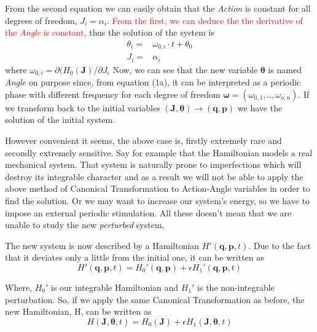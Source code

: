 	From the second equation we can easily obtain that the \textit{Action} is constant for all degrees of freedom, $J_i =\alpha_i$. \textcolor{red}{From the first, we can deduce the the derivative of the \textit{Angle} is constant,} thus the solution of the system is 
	\begin{subequations}\label{eq3}
		\begin{alignat}{2}
			\theta_i =& \omega_{0,i} \cdot t + \theta_0 \\ 
			J_i      =& \alpha_i
		\end{alignat}
	\end{subequations}
 	where $\omega_{0,i} = \partial(H_0(\bm{J})/\partial{J_i}$	
	Now, we can see that the new variable $\bm{\theta}$ is named \textit{Angle} on purpose since, from equation (1a), it can be interpreted as a periodic phase with different frequency for each degree of freedom $\bm{\omega} = (\omega_{0,1},..,\omega_{o,n})$.
	If we transform back to the initial variables $(\bm{J},\bm{\theta})\rightarrow(\bm{q},\bm{p})$ we have the solution of the initial system.
	
	However convenient it seems, the above case is, firstly extremely rare and secondly extremely sensitive. Say for example that the Hamiltonian models a real mechanical system. That system is naturally prone to imperfections which will destroy its integrable character and as a result we will not be able to apply the above method of Canonical Transformation to Action-Angle variables in order to find the solution. Or we may want to increase our system's energy, so we have to impose an external periodic stimulation.
	All these doesn't mean that we are unable to study the new \textit{perturbed} system.
	
	The new system is now described by a Hamiltonian $H'(\bm{q},\bm{p},t)$. Due to the fact that it deviates only a little from the initial one, it can be written as 
		\begin{equation}\label{eq4}
			H'(\bm{q},\bm{p},t) = H_0'(\bm{q},\bm{p}) + \epsilon H_1'(\bm{q},\bm{p},t) 
		\end{equation}
	
	Where, $H_0'$ is our integrable Hamiltonian and $H_1'$ is the non-integrable perturbation. So, if we apply the same Canonical Transformation as before, the new Hamiltonian, H, can be written as 
		\begin{equation}\label{eq5}
			H(\bm{J},\bm{\theta},t) = H_0(\bm{J}) + \epsilon H_1(\bm{J},\bm{\theta},t)
		\end{equation}
	
